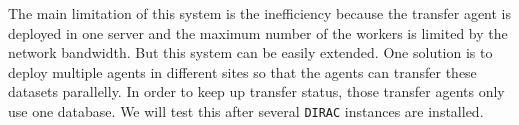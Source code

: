The main limitation of this system is the inefficiency because 
the transfer agent is deployed in one server and the maximum number of 
the workers is limited by the network bandwidth.
But this system can be easily extended.
One solution is to deploy multiple agents in different sites
so that the agents can transfer these datasets parallelly.
In order to keep up transfer status,
those transfer agents only use one database.
We will test this after several {\tt DIRAC} instances are installed.
